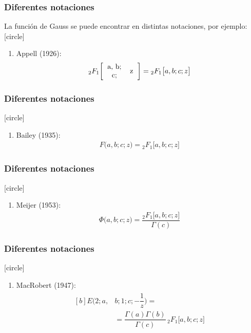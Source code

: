 \documentclass[12pt]{beamer}
\begin{document}
\begin{frame}
\frametitle{Diferentes notaciones}
La función de Gauss se puede encontrar en distintas notaciones, por ejemplo:
[circle]
\begin{enumerate}[<+->]
\item Appell (1926):
\pause
\begin{align}
{}_{2} F_{1} \bigg[
\begin{tabular}{c c}
a, b; & \multirow{2}{*}{z} \\
c; &
\end{tabular} \bigg] = {}_{2} F_{1} \big[ a, b; c; z \big]
\label{eq:ecuacion_01_01_01_06}
\end{align}
\seti 
\end{enumerate}
\end{frame}
\begin{frame}
\frametitle{Diferentes notaciones}
[circle]
\begin{enumerate}[<+->]    
\conti
\item Bailey (1935):
\begin{align}
F \big( a, b; c; z \big) = {}_{2} F_{1} \big[ a, b; c; z \big]
\label{eq:ecuacion_01_01_01_07}
\end{align}
\seti 
\end{enumerate}
\end{frame}
\begin{frame}
\frametitle{Diferentes notaciones}
[circle]
\begin{enumerate}[<+->]    
\conti
\item Meijer (1953):
\begin{align}
\Phi \big( a, b; c; z \big) = \dfrac{{}_{2} F_{1} \big[ a, b; c; z \big]}{\Gamma (c)}
\label{eq:ecuacion_01_01_01_08}
\end{align}
\seti 
\end{enumerate}
\end{frame}
\begin{frame}
\frametitle{Diferentes notaciones}
[circle]
\begin{enumerate}[<+->]    
\conti
\item MacRobert (1947):
\begin{align}
\begin{aligned}[b]
E \big( 2; a, &b; 1; c; -\dfrac{1}{z} \big) = \\[0.5em]
&= \dfrac{\Gamma (a) \Gamma (b)}{\Gamma (c)} \, {}_{2} F_{1} \big[ a, b; c; z \big]
\label{eq:ecuacion_01_01_01_09}
\end{aligned}
\end{align}
\end{enumerate}
\end{frame}
\end{document}
